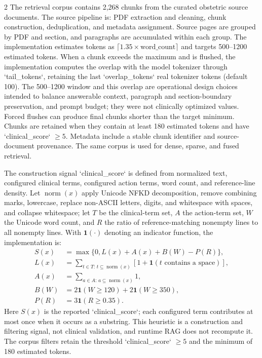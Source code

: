 \documentclass[11pt]{article}
\begin{document}
\begin{multicols}{2}
The retrieval corpus contains 2,268 chunks from the curated obstetric source documents. The source pipeline is: PDF extraction and cleaning, chunk construction, deduplication, and metadata assignment. Source pages are grouped by PDF and section, and paragraphs are accumulated within each group. The implementation estimates tokens as $\lceil 1.35 \times \text{word\_count}\rceil$ and targets 500--1200 estimated tokens. When a chunk exceeds the maximum and is flushed, the implementation computes the overlap with the model tokenizer through `tail\_tokens`, retaining the last `overlap\_tokens` real tokenizer tokens (default 100). The 500--1200 window and this overlap are operational design choices intended to balance answerable context, paragraph and section-boundary preservation, and prompt budget; they were not clinically optimized values. Forced flushes can produce final chunks shorter than the target minimum. Chunks are retained when they contain at least 180 estimated tokens and have `clinical\_score` $\geq 5$. Metadata include a stable chunk identifier and source-document provenance. The same corpus is used for dense, sparse, and fused retrieval.

The construction signal `clinical\_score` is defined from normalized text, configured clinical terms, configured action terms, word count, and reference-line density. Let $\operatorname{norm}(x)$ apply Unicode NFKD decomposition, remove combining marks, lowercase, replace non-ASCII letters, digits, and whitespace with spaces, and collapse whitespace; let $T$ be the clinical-term set, $A$ the action-term set, $W$ the Unicode word count, and $R$ the ratio of reference-matching nonempty lines to all nonempty lines. With $\mathbf{1}(\cdot)$ denoting an indicator function, the implementation is:
\[
\begin{aligned}
S(x)&=\max\{0,L(x)+A(x)+B(W)-P(R)\},\\
L(x)&=\sum_{t\in T:\,t\subseteq\operatorname{norm}(x)}
      [1+\mathbf{1}(t\text{ contains a space})],\\
A(x)&=\sum_{a\in A:\,a\subseteq\operatorname{norm}(x)}1,\\
B(W)&=2\mathbf{1}(W\geq120)+2\mathbf{1}(W\geq350),\\
P(R)&=3\mathbf{1}(R\geq0.35).
\end{aligned}
\]
Here $S(x)$ is the reported `clinical\_score`; each configured term contributes at most once when it occurs as a substring. This heuristic is a construction and filtering signal, not clinical validation, and runtime RAG does not recompute it. The corpus filters retain the threshold `clinical\_score` $\geq 5$ and the minimum of 180 estimated tokens.


\end{multicols}
\end{document}
